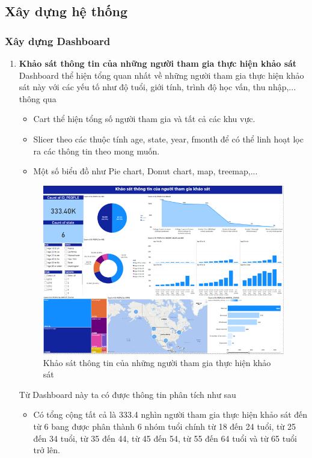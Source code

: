 \subsection{Xây dựng hệ thống}

\subsubsection{Xây dựng Dashboard}
\begin{enumerate}
    \item \textbf{Khảo sát thông tin của những người tham gia thực hiện khảo sát}\\
    Dashboard thể hiện tổng quan nhất về những người tham gia thực hiện khảo sát này với các yếu tố như độ tuổi, giới tính, trình độ học vấn, thu nhập,... thông qua
    \begin{itemize}[label=$-$]
        \item Cart thể hiện tổng số người tham gia và tất cả các khu vực.
        \item Slicer theo các thuộc tính age, state, year, fmonth để có thể linh hoạt lọc ra các thông tin theo mong muốn.
        \item Một số biểu đồ như Pie chart, Donut chart, map, treemap,...
    \end{itemize}
    \begin{center}
        \begin{figure}[!h]
            \centering
            \includegraphics[scale = 0.8]{trang/dashboard1.png}
          \caption{Khảo sát thông tin của những người tham gia thực hiện khảo sát}
        \end{figure}
    \end{center}
    Từ Dashboard này ta có được thông tin phân tích như sau
    \begin{itemize}[label = $-$]
        \item Có tổng cộng tất cả là 333.4 nghìn người tham gia thực hiện khảo sát đến từ 6 bang được phân thành 6 nhóm tuổi chính từ 18 đến 24 tuổi, từ 25 đến 34 tuổi, từ 35 đến 44, từ 45 đến 54, từ 55 đến 64 tuổi và từ 65 tuổi trở lên.
        

\end{itemize}
\end{enumerate}
